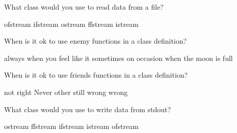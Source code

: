 \documentclass[10pt,addpoints]{exam}
\begin{document}
\begin{questions}
\begin{minipage}{\linewidth}
\end{minipage}


\par\vspace{0.100000in}\begin{minipage}{\linewidth}
\question[2]
What class would you use to read data from a file?
\medskip
\begin{choices}
\choice ofstream
\choice ifstream
\choice ostream
\choice ffstream
\choice istream
\end{choices}
\setlength\answerlinelength{1in}
\answerline[B]

\end{minipage}


\par\vspace{0.100000in}\begin{minipage}{\linewidth}
\question[2]
When is it ok to use enemy functions in a class definition?
\medskip
\begin{choices}
\choice always
\choice when you feel like it
\choice sometimes
\choice on occasion
\choice when the moon is full
\end{choices}
\setlength\answerlinelength{1in}
\answerline[A]

\end{minipage}


\par\vspace{0.100000in}\begin{minipage}{\linewidth}
\question[2]
When is it ok to use friends functions in a class definition?
\medskip
\begin{choices}
\choice not right
\choice Never
\choice other
\choice still wrong
\choice wrong
\end{choices}
\setlength\answerlinelength{1in}
\answerline[B]

\end{minipage}


\par\vspace{0.100000in}\begin{minipage}{\linewidth}
\question[2]
What class would you use to write data from stdout?
\medskip
\begin{choices}
\choice ostream
\choice ffstream
\choice ifstream
\choice istream
\choice ofstream
\end{choices}
\setlength\answerlinelength{1in}
\answerline[A]

\end{minipage}



\end{questions}
\end{document}
